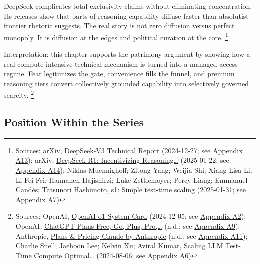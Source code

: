 \documentclass[
  american,
  11pt,
  letterpaper,
]{article}
\begin{document}
DeepSeek complicates total exclusivity claims without eliminating
concentration. Its releases show that parts of reasoning capability
diffuse faster than absolutist frontier rhetoric suggests. The real
story is not zero diffusion versus perfect monopoly. It is diffusion at
the edges and political curation at the core. \footnote{Sources: arXiv,
  \href{https://arxiv.org/abs/2412.19437}{DeepSeek-V3 Technical Report}
  (2024-12-27; see
  \hyperref[ch-06-appendix-a13-deepseek-v3-technical-report]{Appendix
  A13}); arXiv, \href{https://arxiv.org/abs/2501.12948}{DeepSeek-R1:
  Incentivizing Reasoning\ldots{}} (2025-01-22; see
  \hyperref[ch-06-appendix-a14-deepseek-r1-incentivizing-reasoning-capability-in-llms-via-reinforcement-learning]{Appendix
  A14}); Niklas Muennighoff; Zitong Yang; Weijia Shi; Xiang Lisa Li; Li
  Fei-Fei; Hannaneh Hajishirzi; Luke Zettlemoyer; Percy Liang; Emmanuel
  Candès; Tatsunori Hashimoto,
  \href{https://arxiv.org/abs/2501.19393}{s1: Simple test-time scaling}
  (2025-01-31; see
  \hyperref[ch-06-appendix-a7-s1-simple-test-time-scaling]{Appendix A7})}

Interpretation: this chapter supports the patrimony argument by showing
how a real compute-intensive technical mechanism is turned into a
managed access regime. Fear legitimizes the gate, convenience fills the
funnel, and premium reasoning tiers convert collectively grounded
capability into selectively governed scarcity. \footnote{Sources:
  OpenAI, \href{https://openai.com/index/openai-o1-system-card/}{OpenAI
  o1 System Card} (2024-12-05; see
  \hyperref[ch-06-appendix-a2-openai-o1-system-card]{Appendix A2});
  OpenAI, \href{https://chatgpt.com/pricing/}{ChatGPT Plans \textbar{}
  Free, Go, Plus, Pro,\ldots{}} (n.d.; see
  \hyperref[ch-06-appendix-a9-chatgpt-plans-free-go-plus-pro-business-and-enterprise]{Appendix
  A9}); Anthropic, \href{https://claude.com/pricing}{Plans \& Pricing
  \textbar{} Claude by Anthropic} (n.d.; see
  \hyperref[ch-06-appendix-a11-plans-pricing-claude-by-anthropic]{Appendix
  A11}); Charlie Snell; Jaehoon Lee; Kelvin Xu; Aviral Kumar,
  \href{https://arxiv.org/abs/2408.03314}{Scaling LLM Test-Time Compute
  Optimal\ldots{}} (2024-08-06; see
  \hyperref[ch-06-appendix-a6-scaling-llm-test-time-compute-optimally-can-be-more-effective-than-scaling-model-parameters]{Appendix
  A6})}

\subsection{Position Within the
Series}\label{position-within-the-series-6}
\end{document}
